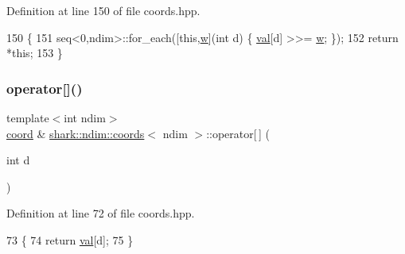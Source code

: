 Definition at line 150 of file coords.\+hpp.


\begin{DoxyCode}
150                                                                        \{
151             seq<0,ndim>::for\_each([\textcolor{keyword}{this},\hyperlink{classshark_1_1_group_af542c8e71a81c12d6a73203ef9152d1f}{w}](\textcolor{keywordtype}{int} d) \{ \hyperlink{structshark_1_1ndim_1_1coords_a425262af388367b0f0079218e038aef5}{val}[d] >>= \hyperlink{classshark_1_1_group_af542c8e71a81c12d6a73203ef9152d1f}{w}; \});
152             \textcolor{keywordflow}{return} *\textcolor{keyword}{this};
153         \}
\end{DoxyCode}
\hypertarget{structshark_1_1ndim_1_1coords_a1fbf31166313ae261a6dbfe4435dc7ff}{}\label{structshark_1_1ndim_1_1coords_a1fbf31166313ae261a6dbfe4435dc7ff} 
\subsubsection{\texorpdfstring{operator[]()}{operator[]()}\hspace{0.1cm}{\footnotesize\ttfamily [1/2]}}
{\footnotesize\ttfamily template$<$int ndim$>$ \\
\hyperlink{namespaceshark_a767a92d5dd82cb82266473bff42fa6d9}{coord} \& \hyperlink{structshark_1_1ndim_1_1coords}{shark\+::ndim\+::coords}$<$ ndim $>$\+::operator\mbox{[}$\,$\mbox{]} (\begin{DoxyParamCaption}\item[{int}]{d }\end{DoxyParamCaption})\hspace{0.3cm}{\ttfamily [inline]}}



Definition at line 72 of file coords.\+hpp.


\begin{DoxyCode}
73         \{
74             \textcolor{keywordflow}{return} \hyperlink{structshark_1_1ndim_1_1coords_a425262af388367b0f0079218e038aef5}{val}[d];
75         \}
\end{DoxyCode}
\hypertarget{structshark_1_1ndim_1_1coords_ae3904f69cf3d34187a3bee566d9178d4}{}\label{structshark_1_1ndim_1_1coords_ae3904f69cf3d34187a3bee566d9178d4} 
